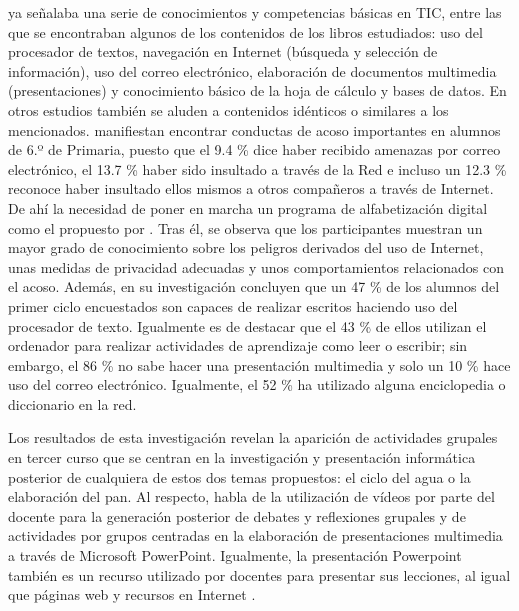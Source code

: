 \documentclass{textolivre}
\begin{document}
\textcite{marques_graells_nueva_2007} ya señalaba una serie de conocimientos y competencias básicas en TIC, entre las que se encontraban algunos de los contenidos de los libros estudiados: uso del procesador de textos, navegación en Internet (búsqueda y selección de información), uso del correo electrónico, elaboración de documentos multimedia (presentaciones) y conocimiento básico de la hoja de cálculo y bases de datos. En otros estudios también se aluden a contenidos idénticos o similares a los mencionados. \textcite{fernandez-montalvo_habitos_2015} manifiestan encontrar conductas de acoso importantes en alumnos de 6.º de Primaria, puesto que el 9.4 \% dice haber recibido amenazas por correo electrónico, el 13.7 \% haber sido insultado a través de la Red e incluso un 12.3 \% reconoce haber insultado ellos mismos a otros compañeros a través de Internet. De ahí la necesidad de poner en marcha un programa de alfabetización digital como el propuesto por \textcite{fernandez-montalvo_effectiveness_2017}. Tras él, se observa que los participantes muestran un mayor grado de conocimiento sobre los peligros derivados del uso de Internet, unas medidas de privacidad adecuadas y unos comportamientos relacionados con el acoso. Además, \textcite{gamiz_sanchez_estudio_2016} en su investigación concluyen que un 47 \% de los alumnos del primer ciclo encuestados son capaces de realizar escritos haciendo uso del procesador de texto. Igualmente es de destacar que el 43 \% de ellos utilizan el ordenador para realizar actividades de aprendizaje como leer o escribir; sin embargo, el 86 \% no sabe hacer una presentación multimedia y solo un 10 \% hace uso del correo electrónico. Igualmente, el 52 \% ha utilizado alguna enciclopedia o diccionario en la red. 

Los resultados de esta investigación revelan la aparición de actividades grupales en tercer curso que se centran en la investigación y presentación informática posterior de cualquiera de estos dos temas propuestos: el ciclo del agua o la elaboración del pan. Al respecto, \textcite{martin_garcia_alisis_2016} habla de la utilización de vídeos por parte del docente para la generación posterior de debates y reflexiones grupales y de actividades por grupos centradas en la elaboración de presentaciones multimedia a través de Microsoft PowerPoint. Igualmente, la presentación Powerpoint también es un recurso utilizado por docentes para presentar sus lecciones, al igual que páginas web y recursos en Internet \cite{trujillo_torres_caracterizacion_2011}.
\end{document}
